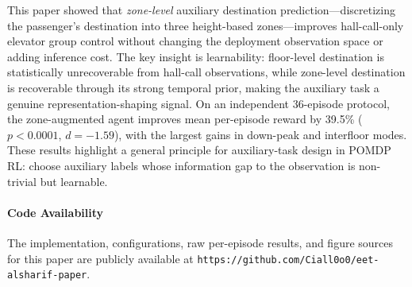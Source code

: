 \documentclass{IEEEcsmag}
\begin{document}
This paper showed that \emph{zone-level} auxiliary destination
prediction---discretizing the passenger's destination into three
height-based zones---improves hall-call-only elevator group control
without changing the deployment observation space or adding inference
cost. The key insight is learnability: floor-level destination is
statistically unrecoverable from hall-call observations, while
zone-level destination is recoverable through its strong temporal
prior, making the auxiliary task a genuine representation-shaping
signal. On an independent 36-episode protocol, the zone-augmented
agent improves mean per-episode reward by 39.5\%
($p < 0.0001$, $d = -1.59$), with the largest gains in
down-peak and interfloor modes. These results highlight a general
principle for auxiliary-task design in POMDP RL: choose auxiliary
labels whose information gap to the observation is non-trivial but
learnable.


\paragraph{Code Availability}
The implementation, configurations, raw per-episode results, and figure sources for this paper are publicly available at \texttt{https://github.com/Ciall0o0/eet-alsharif-paper}.
\end{document}
